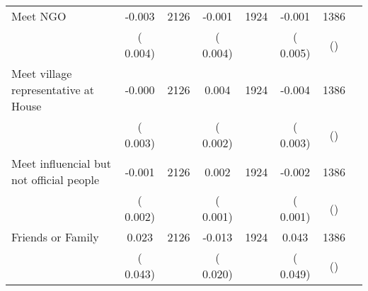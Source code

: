 \begin{tabular}{l*{6}{c}}
Meet NGO        &             -0.003      &       2126       &             -0.001      &       1924       &             -0.001      &       1386  &  &              \\
                       &       (       0.004)            &                               &       (       0.004)            &                               &       (       0.005)            &       () &                  \\
Meet village representative at House        &             -0.000      &       2126       &              0.004      &       1924       &             -0.004      &       1386  &  &              \\
                       &       (       0.003)            &                               &       (       0.002)            &                               &       (       0.003)            &       () &                  \\
Meet influencial but not official people        &             -0.001      &       2126       &              0.002      &       1924       &             -0.002      &       1386  &  &              \\
                       &       (       0.002)            &                               &       (       0.001)            &                               &       (       0.001)            &       () &                  \\
Friends or Family        &              0.023      &       2126       &             -0.013      &       1924       &              0.043      &       1386  &  &              \\
                       &       (       0.043)            &                               &       (       0.020)            &                               &       (       0.049)            &       () &                  \\
\hline \end{tabular}